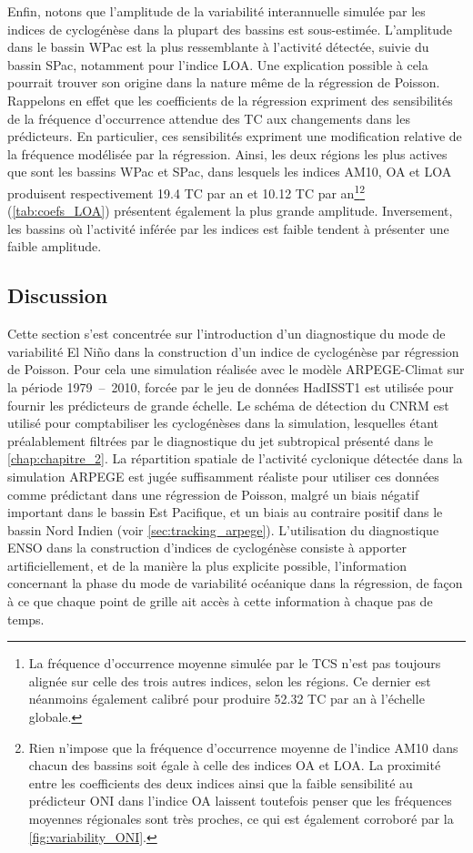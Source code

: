 \documentclass[../main.tex]{subfiles}
\begin{document}
Enfin, notons que l'amplitude de la variabilité interannuelle simulée par les indices de cyclogénèse dans la plupart des bassins est sous-estimée. L'amplitude
dans le bassin WPac est la plus ressemblante à l'activité détectée, suivie du bassin SPac, notamment pour l'indice LOA. Une explication possible à cela pourrait
trouver son origine dans la nature même de la régression de Poisson. Rappelons en effet que les coefficients de la régression expriment des sensibilités de la
fréquence d'occurrence attendue des TC aux changements dans les prédicteurs. En particulier, ces sensibilités expriment une modification relative de la
fréquence modélisée par la régression. Ainsi, les deux régions les plus actives que sont les bassins WPac et SPac, dans lesquels les indices AM10, OA et LOA
produisent respectivement \num{19.4} TC par an et \num{10.12} TC par an\footnote{La fréquence d'occurrence moyenne simulée par le TCS n'est pas toujours alignée
sur celle des trois autres indices, selon les régions. Ce dernier est néanmoins également calibré pour produire \num{52.32} TC par an à l'échelle
globale.}\footnote{Rien n'impose que la fréquence d'occurrence moyenne de l'indice AM10 dans chacun des bassins soit égale à celle des indices OA et LOA. La
proximité entre les coefficients des deux indices ainsi que la faible sensibilité au prédicteur ONI dans l'indice OA laissent toutefois penser que les
fréquences moyennes régionales sont très proches, ce qui est également corroboré par la \cref{fig:variability_ONI}.} (\cref{tab:coefs_LOA}) présentent également
la plus grande amplitude. Inversement, les bassins où l'activité inférée par les indices est faible tendent à présenter une faible amplitude.

\subsection{Discussion}

Cette section s'est concentrée sur l'introduction d'un diagnostique du mode de variabilité El Niño dans la construction d'un indice de cyclogénèse par
régression de Poisson. Pour cela une simulation réalisée avec le modèle ARPEGE-Climat sur la période \num{1979}~--~\num{2010}, forcée par le jeu de données
HadISST1 est utilisée pour fournir les prédicteurs de grande échelle. Le schéma de détection du CNRM est utilisé pour comptabiliser les cyclogénèses dans la
simulation, lesquelles étant préalablement filtrées par le diagnostique du jet subtropical présenté dans le \cref{chap:chapitre_2}. La répartition spatiale de
l'activité cyclonique détectée dans la simulation ARPEGE est jugée suffisamment réaliste pour utiliser ces données comme prédictant dans une régression de
Poisson, malgré un biais négatif important dans le bassin Est Pacifique, et un biais au contraire positif dans le bassin Nord Indien (voir
\cref{sec:tracking_arpege}). L'utilisation du diagnostique ENSO dans la construction d'indices de cyclogénèse consiste à apporter artificiellement, et de la
manière la plus explicite possible, l'information concernant la phase du mode de variabilité océanique dans la régression, de façon à ce que chaque point de
grille ait accès à cette information à chaque pas de temps.
\end{document}
